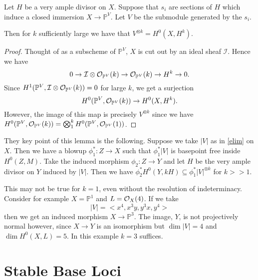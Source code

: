 \begin{lemma}\label{ampall}
	
	Let $H$ be a very ample divisor on $X$. Suppose that $s_{i}$ are sections of $H$ which induce a closed immersion $X \to \mathbb{P}^{V}$. Let $V$ be the submodule generated by the $s_{i}$.
	
	Then for $k$ sufficiently large we have that $V^{\otimes k}=H^{0}(X,H^{k})$.
	
\end{lemma}

\begin{proof}
	
	Thought of as a subscheme of $\mathbb{P}^{V}$, $X$ is cut out by an ideal sheaf $\mathcal{I}$. Hence we have 
	\[0 \to \mathcal{I}\otimes \ox[\mathbb{P}^{V}](k) \to \ox[\mathbb{P}^{V}](k) \to H^{k} \to 0.\]
	Since $H^{1}(\mathbb{P}^{V}, \mathcal{I}\otimes \ox[\mathbb{P}^{V}](k))=0$ for large $k$, we get a surjection $$H^{0}(\mathbb{P}^{V},\ox[\mathbb{P}^{V}](k)) \to H^{0}(X,H^{k}).$$ However, the image of this map is precisely $V^{\otimes k}$ since we have $H^{0}(\mathbb{P}^{V},\ox[\mathbb{P}^{V}](k))=\bigotimes_{1}^{k}H^{0}(\mathbb{P}^{V},\ox[\mathbb{P}^{V}](1))$.

\end{proof}

\begin{remark}
	They key point of this lemma is the following. Suppose we take $|V|$ as in \autoref{elim} on $X$. Then we have a blowup $\phi_{1}^{*} \colon Z \to X$ such that $\phi_{1}^{*}|V|$ is basepoint free inside $H^{0}(Z,M)$. Take the induced morphism $\phi_{2}\colon Z \to Y$ and let $H$ be the very ample divisor on $Y$ induced by $|V|$. Then we have $\phi_{2}^{*}H^{0}(Y,kH) \subseteq \phi_{1}^{*}|V|^{\otimes k}$ for $k>>1$.
	
	This may not be true for $k=1$, even without the resolution of indeterminacy. Consider for example $X=\mathbb{P}^{1}$ and $L=\ox(4)$. If we take $$|V|=<x^4,x^3y,y^3x,y^{4}>$$ then we get an induced morphism $X \to \mathbb{P}^{3}$. The image, $Y$, is not projectively normal however, since $X \to Y$ is an isomorphism but $\dim |V| =4$ and $\dim H^{0}(X,L)=5$. In this example $k=3$ suffices.
	
\end{remark}


\section{Stable Base Loci}

